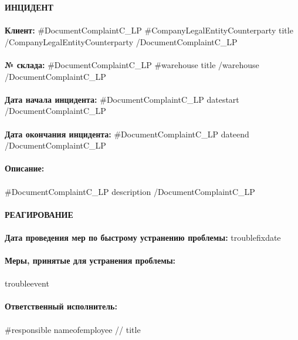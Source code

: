 {{{{{{{\noindent \textbf{ИНЦИДЕНТ} \\
\vspace{1mm} \\
\textbf{Клиент:} {{#DocumentComplaintC_LP}} {{#CompanyLegalEntityCounterparty}} {{title}} {{/CompanyLegalEntityCounterparty}} {{/DocumentComplaintC_LP}}  \\
\vspace{1mm} \\
\textbf{№ склада:}  {{#DocumentComplaintC_LP}}  {{#warehouse}} {{title}} {{/warehouse}} {{/DocumentComplaintC_LP}}   \\
\vspace{1mm} \\
\textbf{Дата начала инцидента:} {{#DocumentComplaintC_LP}} {{datestart}}  {{/DocumentComplaintC_LP}}  \\
\vspace{1mm} \\
\textbf{Дата окончания инцидента:}  {{#DocumentComplaintC_LP}} {{dateend}}  {{/DocumentComplaintC_LP}}  \\
\vspace{1mm} \\
\textbf{Описание:} \\
\vspace{1mm} \\
{{#DocumentComplaintC_LP}} {{description}} {{/DocumentComplaintC_LP}}  \\
\vspace{7mm} \\
\noindent\textbf{РЕАГИРОВАНИЕ} \\
\vspace{1mm} \\
\noindent\textbf{Дата проведения мер по быстрому устранению проблемы:} {{troublefixdate}}  \\
\vspace{1mm} \\
\noindent\textbf{Меры, принятые для устранения проблемы:} \\
\vspace{1mm} \\
 {{troubleevent}} \\
 \vspace{1mm} \\
\noindent\textbf{Ответственный исполнитель:} \\
\vspace{1mm} \\
{{#responsible}}
 {{nameofemployee}} // {{title}}  \\
}}}}}}}
